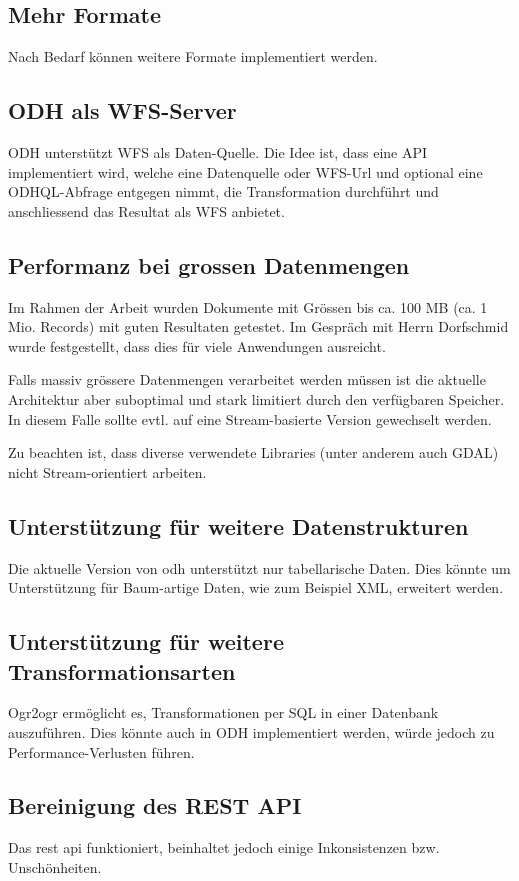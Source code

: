\subsection{Mehr Formate}
Nach Bedarf können weitere Formate implementiert werden.

\subsection{ODH als WFS-Server}
ODH unterstützt WFS als Daten-Quelle. Die Idee ist, dass eine API implementiert wird, welche eine Datenquelle oder WFS-Url und optional eine ODHQL-Abfrage entgegen nimmt, die Transformation durchführt und anschliessend das Resultat als WFS anbietet.

\subsection{Performanz bei grossen Datenmengen}
Im Rahmen der Arbeit wurden Dokumente mit Grössen bis ca. 100 MB (ca. 1 Mio. Records) mit guten Resultaten getestet. Im Gespräch mit Herrn Dorfschmid wurde festgestellt, dass dies für viele Anwendungen ausreicht.

Falls massiv grössere Datenmengen verarbeitet werden müssen ist die aktuelle Architektur aber suboptimal und stark limitiert durch den verfügbaren Speicher. In diesem Falle sollte evtl. auf eine Stream-basierte Version gewechselt werden.

Zu beachten ist, dass diverse verwendete Libraries (unter anderem auch GDAL) nicht Stream-orientiert arbeiten.

\subsection{Unterstützung für weitere Datenstrukturen}
Die aktuelle Version von \acs{odh} unterstützt nur tabellarische Daten. Dies könnte um Unterstützung für Baum-artige Daten, wie zum Beispiel XML, erweitert werden. 

\subsection{Unterstützung für weitere Transformationsarten}
Ogr2ogr ermöglicht es, Transformationen per SQL in einer Datenbank auszuführen. Dies könnte auch in ODH implementiert werden, würde jedoch zu Performance-Verlusten führen.

\subsection{Bereinigung des REST API}
Das \gls{rest} \acs{api} funktioniert, beinhaltet jedoch einige Inkonsistenzen bzw. Unschönheiten. 

